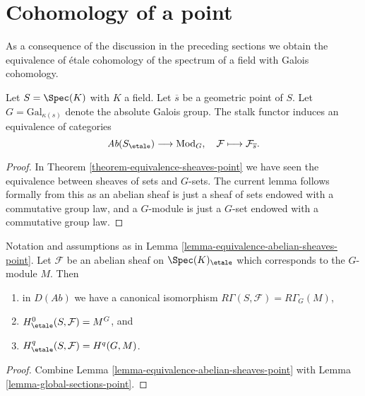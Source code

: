 \section{Cohomology of a point}
\label{section-cohomology-point}

\noindent
As a consequence of the discussion in the preceding sections
we obtain the equivalence of \'etale cohomology of the spectrum of a
field with Galois cohomology.

\begin{lemma}
\label{lemma-equivalence-abelian-sheaves-point}
Let $S = \Spec(K)$ with $K$ a field.
Let $\overline{s}$ be a geometric point of $S$.
Let $G = \text{Gal}_{\kappa(s)}$ denote the absolute Galois group.
The stalk functor induces an equivalence of categories
$$
\textit{Ab}(S_\etale) \longrightarrow \text{Mod}_G,
\quad
\mathcal{F} \longmapsto \mathcal{F}_{\overline{s}}.
$$
\end{lemma}

\begin{proof}
In
Theorem \ref{theorem-equivalence-sheaves-point}
we have seen the equivalence between sheaves of sets and $G$-sets.
The current lemma follows formally from this as an abelian sheaf is just
a sheaf of sets endowed with a commutative group law, and a $G$-module
is just a $G$-set endowed with a commutative group law.
\end{proof}

\begin{lemma}
\label{lemma-compare-cohomology-point}
Notation and assumptions as in
Lemma \ref{lemma-equivalence-abelian-sheaves-point}.
Let $\mathcal{F}$ be an abelian sheaf on $\Spec(K)_\etale$
which corresponds to the $G$-module $M$.
Then
\begin{enumerate}
\item in $D(\textit{Ab})$ we have a canonical isomorphism
$R\Gamma(S, \mathcal{F}) = R\Gamma_G(M)$,
\item $H_\etale^0(S, \mathcal{F}) = M^G$, and
\item $H_\etale^q(S, \mathcal{F}) = H^q(G, M)$.
\end{enumerate}
\end{lemma}

\begin{proof}
Combine
Lemma \ref{lemma-equivalence-abelian-sheaves-point}
with
Lemma \ref{lemma-global-sections-point}.
\end{proof}

